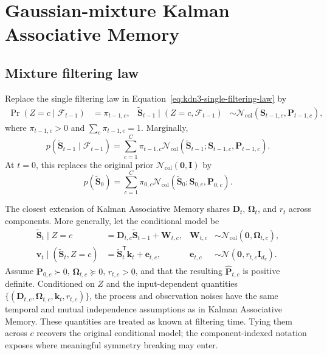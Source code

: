 \documentclass[11pt]{article}
\newcommand{\ve}[1]{\boldsymbol{#1}}
\newcommand{\tr}{\mathsf{T}}
\newcommand{\Normal}{\mathcal{N}}
\begin{document}
\section{Gaussian-mixture Kalman Associative Memory}
\label{sec:kdn3-mixture-kam}

\subsection{Mixture filtering law}

Replace the single filtering law in Equation~\eqref{eq:kdn3-single-filtering-law} by
\begin{equation}
\begin{aligned}
  \Pr(Z=c\mid\mathcal{F}_{t-1})
  &=\pi_{t-1,c},
  &
  \widetilde{\ve{S}}_{t-1}\mid
  (Z=c,\mathcal{F}_{t-1})
  &\sim\Normal_{\mathrm{col}}(\ve{S}_{t-1,c},\ve{P}_{t-1,c}),
\end{aligned}
  \label{eq:kdn3-component-filtering-law}
\end{equation}
where $\pi_{t-1,c}>0$ and $\sum_c\pi_{t-1,c}=1$.  Marginally,
\begin{equation}
  p(\widetilde{\ve{S}}_{t-1}\mid\mathcal{F}_{t-1})
  =\sum_{c=1}^{C}\pi_{t-1,c}
   \Normal_{\mathrm{col}}(
     \widetilde{\ve{S}}_{t-1};\ve{S}_{t-1,c},\ve{P}_{t-1,c}).
  \label{eq:kdn3-mixture-filtering-law}
\end{equation}
At $t=0$, this replaces the original prior
$\Normal_{\mathrm{col}}(\ve{0},\ve{I})$ by
\begin{equation}
  p(\widetilde{\ve{S}}_0)
  =\sum_{c=1}^{C}\pi_{0,c}
   \Normal_{\mathrm{col}}(
     \widetilde{\ve{S}}_0;\ve{S}_{0,c},\ve{P}_{0,c}).
  \label{eq:kdn3-mixture-prior}
\end{equation}

The closest extension of Kalman Associative Memory shares
$\ve{D}_t$, $\ve{\Omega}_t$, and $r_t$ across components.  More generally, let the conditional
model be
\begin{equation}
\begin{aligned}
  \widetilde{\ve{S}}_t\mid Z=c
  &=\ve{D}_{t,c}\widetilde{\ve{S}}_{t-1}+\ve{W}_{t,c},
  &
  \ve{W}_{t,c}
  &\sim\Normal_{\mathrm{col}}(\ve{0},\ve{\Omega}_{t,c}),
  \\
  \ve{v}_t\mid(\widetilde{\ve{S}}_t,Z=c)
  &=\widetilde{\ve{S}}_t^{\tr}\ve{k}_t+\ve{e}_{t,c},
  &
  \ve{e}_{t,c}
  &\sim\Normal(\ve{0},r_{t,c}\ve{I}_{d_v}).
\end{aligned}
  \label{eq:kdn3-component-model}
\end{equation}
Assume $\ve{P}_{0,c}\succ0$, $\ve{\Omega}_{t,c}\succeq0$, $r_{t,c}>0$, and that the resulting
$\widehat{\ve{P}}_{t,c}$ is positive definite.  Conditioned on
$Z$ and the input-dependent quantities
$\{(\ve{D}_{t,c},\ve{\Omega}_{t,c},\ve{k}_t,r_{t,c})\}$, the process and observation noises have
the same temporal and mutual independence assumptions as in Kalman Associative Memory.  These
quantities are treated as known at filtering time.  Tying them across $c$ recovers the original
conditional model; the component-indexed notation exposes where meaningful symmetry breaking may
enter.
\end{document}
